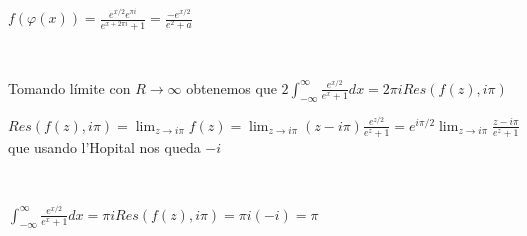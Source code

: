 \begin{sol}
$f(\varphi(x)) = \frac{e^{x/2}e^{\pi i}}{e^{x+2\pi i}+1} = \frac{-e^{x/2}}{e^2+a}$

\

Tomando límite con $R\rightarrow\infty$ obtenemos que
$2\int_{-\infty}^{\infty} \frac{e^{x/2}}{e^x+1} dx = 2\pi iRes(f(z),i\pi)$

$Res(f(z),i\pi) = \lim_{z\rightarrow i\pi} f(z) = \lim_{z\rightarrow i\pi} (z-i\pi) \frac{e^{z/2}}{e^z+1} = e^{i\pi/2} \lim_{z\rightarrow i\pi} \frac{z-i\pi}{e^z+1}$
que usando l'Hopital nos queda
$-i$

\

$\int_{-\infty}^{\infty} \frac{e^{x/2}}{e^x+1} dx = \pi iRes(f(z),i\pi) = \pi i(-i) = \pi $
\end{sol}

